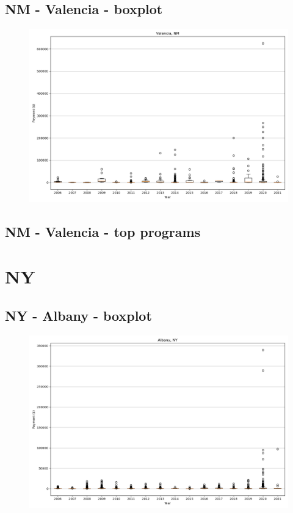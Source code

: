 \subsection*{NM - Valencia - boxplot}
\begin{figure}[h]
\centering
\includegraphics[width=7in]{../output/boxplots/counties/Valencia-NM_boxplot.png}
\end{figure}


\subsection*{NM - Valencia - top programs}

\newpage
\section*{NY}
\subsection*{NY - Albany - boxplot}
\begin{figure}[h]
\centering
\includegraphics[width=7in]{../output/boxplots/counties/Albany-NY_boxplot.png}
\end{figure}


